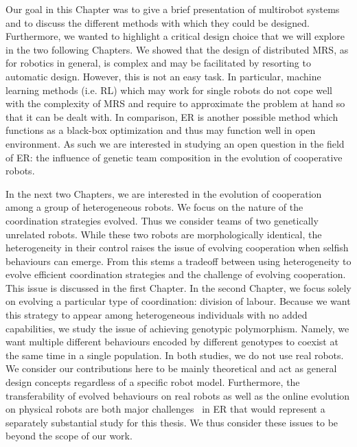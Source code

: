   Our goal in this Chapter was to give a brief presentation of multirobot systems and to discuss the different methods with which they could be designed. Furthermore, we wanted to highlight a critical design choice that we will explore in the two following Chapters. We showed that the design of distributed MRS, as for robotics in general, is complex and may be facilitated by resorting to automatic design. However, this is not an easy task. In particular, machine learning methods (i.e. RL) which may work for single robots do not cope well with the complexity of MRS and require to approximate the problem at hand so that it can be dealt with. In comparison, ER is another possible method which functions as a black-box optimization and thus may function well in open environment. As such we are interested in studying an open question in the field of ER: the influence of genetic team composition in the evolution of cooperative robots.


  In the next two Chapters, we are interested in the evolution of cooperation among a group of heterogeneous robots. We focus on the nature of the coordination strategies evolved. Thus we consider teams of two genetically unrelated robots. While these two robots are morphologically identical, the heterogeneity in their control raises the issue of evolving cooperation when selfish behaviours can emerge. From this stems a tradeoff between using heterogeneity to evolve efficient coordination strategies and the challenge of evolving cooperation. This issue is discussed in the first Chapter. In the second Chapter, we focus solely on evolving a particular type of coordination: division of labour. Because we want this strategy to appear among heterogeneous individuals with no added capabilities, we study the issue of achieving genotypic polymorphism. Namely, we want multiple different behaviours encoded by different genotypes to coexist at the same time in a single population. In both studies, we do not use real robots. We consider our contributions here to be mainly theoretical and act as general design concepts regardless of a specific robot model. Furthermore, the transferability of evolved behaviours on real robots as well as the online evolution on physical robots are both major challenges~\parencite{Floreano2008, Doncieux2015a} in ER that would represent a separately substantial study for this thesis. We thus consider these issues to be beyond the scope of our work.

